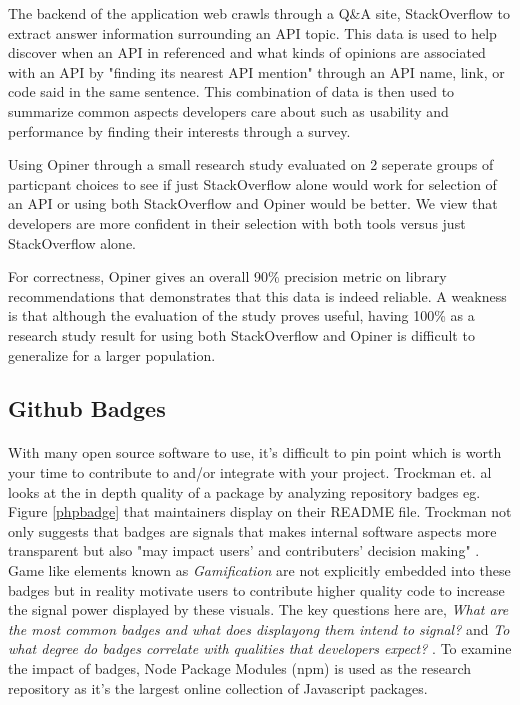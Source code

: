 \documentclass[12pt]{article}
\begin{document}
The backend of the application web crawls through a Q\&A site, StackOverflow \cite{stackoverflow} to extract answer
information surrounding an API topic. This data is used to help discover when an API in referenced and what kinds of opinions
are associated with an API by "finding its nearest API mention" \cite{opinerarticle} through an API name, link, or code said in the same sentence. 
This combination of data is then used to summarize common aspects developers care about such as usability and performance 
by finding their interests through a survey.

Using Opiner \cite{opiner} through a small research study evaluated on 2 seperate groups of particpant choices to see if 
just StackOverflow \cite{stackoverflow} alone would work for selection of an API or using both StackOverflow and Opiner would be better.
We view that developers are more confident in their selection with both tools versus just StackOverflow alone. 

For correctness, Opiner gives an overall 90\% precision metric on library recommendations that demonstrates that this data is indeed reliable.
A weakness is that although the evaluation of the study proves useful, having 100\% as a research study result for using both StackOverflow and Opiner
is difficult to generalize for a larger population. 

\subsection{Github Badges}
\paragraph{}
With many open source software to use, it's difficult to pin point which is worth your time to contribute to and/or integrate with your project.
Trockman et. al \cite{githubbadges} looks at the in depth quality of a package by analyzing repository badges 
eg. Figure \ref{phpbadge} that maintainers display on their README file.
Trockman not only suggests that badges are signals that makes internal software aspects more transparent 
but also "may impact users' and contributers' decision making" \cite{githubbadges}.
Game like elements known as \textit{Gamification} are not explicitly embedded into these badges 
but in reality motivate users to contribute higher quality code to increase the signal power displayed by these visuals. 
The key questions here are, \textit{What are the most common badges and what does displayong them intend to signal?} and 
\textit{To what degree do badges correlate with qualities that developers expect?} \cite{githubbadges}.
To examine the impact of badges, Node Package Modules (npm) \cite{npm} is used as the research repository 
as it's the largest online collection of Javascript packages. 
\end{document}
